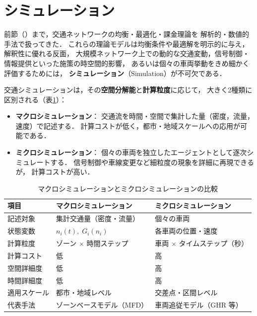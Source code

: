 

\section{シミュレーション}
\label{sec:ch8-simulation}

前節（）まで，交通ネットワークの均衡・最適化・課金理論を
解析的・数値的手法で扱ってきた．
これらの理論モデルは均衡条件や最適解を明示的に与え，解釈性に優れる反面，
大規模ネットワーク上での動的な交通変動，信号制御・情報提供といった施策の時空間的影響，
あるいは個々の車両挙動をきめ細かく評価するためには，
\textbf{シミュレーション}（Simulation）が不可欠である．

交通シミュレーションは，その\textbf{空間分解能}と\textbf{計算粒度}に応じて，
大きく2種類に区別される（表\ref{tab:sim-comparison}）：

\begin{itemize}
  \item \textbf{マクロシミュレーション}：
    交通流を時間・空間で集計した量（密度，流量，速度）で記述する．
    計算コストが低く，都市・地域スケールへの応用が可能である．
  \item \textbf{ミクロシミュレーション}：
    個々の車両を独立したエージェントとして逐次シミュレートする．
    信号制御や車線変更など細粒度の現象を詳細に再現できるが，
    計算コストが高い．
\end{itemize}

\begin{table}[htbp]
  \centering
  \caption{マクロシミュレーションとミクロシミュレーションの比較}
  \label{tab:sim-comparison}
  \begin{tabular}{lll}
    \toprule
    項目 & マクロシミュレーション & ミクロシミュレーション \\
    \midrule
    記述対象      & 集計交通量（密度・流量） & 個々の車両 \\
    状態変数      & $n_i(t),\; G_i(n_i)$     & 各車両の位置・速度 \\
    計算粒度      & ゾーン $\times$ 時間ステップ & 車両 $\times$ タイムステップ（秒） \\
    計算コスト    & 低                         & 高 \\
    空間詳細度    & 低                         & 高 \\
    時間詳細度    & 低                         & 高 \\
    適用スケール  & 都市・地域レベル           & 交差点・区間レベル \\
    代表手法      & ゾーンベースモデル（MFD）  & 車両追従モデル（GHR 等） \\
    \bottomrule
  \end{tabular}
\end{table}

